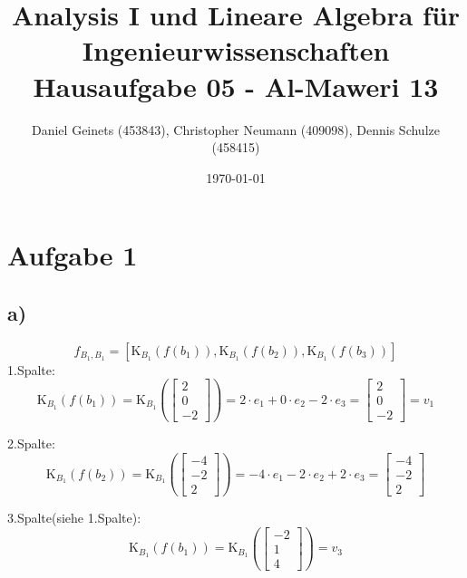 \documentclass[a4paper, 11pt]{article}
\author{Daniel Geinets (453843), Christopher Neumann (409098), Dennis Schulze (458415)}
\date{\today}
\title{Analysis I und Lineare Algebra für Ingenieurwissenschaften \large  \\ Hausaufgabe 05 - Al-Maweri 13}
\begin{document}
\maketitle
\tableofcontents

\setcounter{secnumdepth}{0}
\newcommand{\tuple}[1]{\left(#1\right)}
\renewcommand{\cfrac}[3]{#1 \tuple{\frac{#2}{#3}}}
\newcommand{\R}{\mathbb{R}}
\newcommand{\Z}{\mathbb{Z}}
\newcommand{\Q}{\mathbb{Q}}
\newcommand{\N}{\mathbb{N}}
\newcommand{\C}{\mathbb{C}}

\makeatletter
\renewcommand*\env@matrix[1][*\c@MaxMatrixCols c]{%
\hskip -\arraycolsep
\let\@ifnextchar\new@ifnextchar
\array{#1}}
\makeatother

\pagebreak

\section{Aufgabe 1}
\label{sec:org8725fd7}
\subsection{a)}
\label{sec:orgfdd8f53}
$$f_{B_1,B_1} = \left[\text{K}_{B_1}(f(b_1)), \text{K}_{B_1}(f(b_2)), \text{K}_{B_1}(f(b_3))\right]$$
1.Spalte:
$$\text{K}_{B_1}(f(b_1)) = \text{K}_{B_1}\left(\begin{bmatrix} 2 \\ 0 \\ -2 \end{bmatrix}\right) = 2 \cdot e_1 + 0 \cdot e_2 - 2 \cdot e_3
= \begin{bmatrix} 2 \\ 0 \\ -2 \end{bmatrix} = v_1$$

2.Spalte:
$$\text{K}_{B_1}(f(b_2)) = \text{K}_{B_1}\left(\begin{bmatrix} -4 \\ -2 \\ 2 \end{bmatrix}\right) = - 4 \cdot e_1 - 2 \cdot e_2 + 2 \cdot e_3
= \begin{bmatrix} -4 \\ -2 \\ 2 \end{bmatrix}$$

3.Spalte(siehe 1.Spalte):
$$\text{K}_{B_1}(f(b_1)) = \text{K}_{B_1}\left(\begin{bmatrix} -2 \\ 1 \\ 4 \end{bmatrix}\right) = v_3$$
\end{document}
